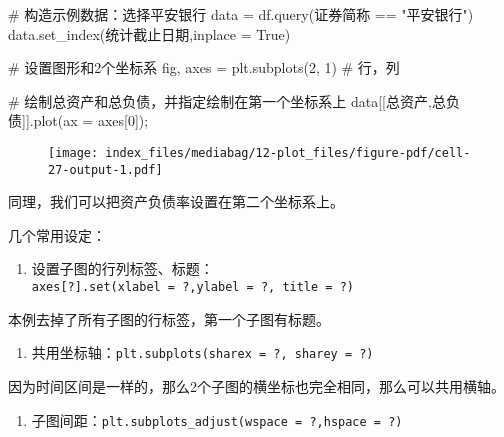 \documentclass[
  letterpaper,
  DIV=11,
  numbers=noendperiod]{scrreprt}
\newenvironment{Shaded}{\begin{snugshade}}{\end{snugshade}}
\newcommand{\CommentTok}[1]{\textcolor[rgb]{0.37,0.37,0.37}{#1}}
\newcommand{\DecValTok}[1]{\textcolor[rgb]{0.68,0.00,0.00}{#1}}
\newcommand{\NormalTok}[1]{\textcolor[rgb]{0.00,0.23,0.31}{#1}}
\newcommand{\OperatorTok}[1]{\textcolor[rgb]{0.37,0.37,0.37}{#1}}
\newcommand{\StringTok}[1]{\textcolor[rgb]{0.13,0.47,0.30}{#1}}
\newcommand{\VariableTok}[1]{\textcolor[rgb]{0.07,0.07,0.07}{#1}}
\providecommand{\tightlist}{%
  \setlength{\itemsep}{0pt}\setlength{\parskip}{0pt}}\usepackage{longtable,booktabs,array}
\begin{document}
\begin{Shaded}
\begin{Highlighting}[]
\CommentTok{\# 构造示例数据：选择平安银行}
\NormalTok{data }\OperatorTok{=}\NormalTok{ df.query(}\StringTok{\textquotesingle{}证券简称 == "平安银行"\textquotesingle{}}\NormalTok{)}
\NormalTok{data.set\_index(}\StringTok{\textquotesingle{}统计截止日期\textquotesingle{}}\NormalTok{,inplace }\OperatorTok{=} \VariableTok{True}\NormalTok{)}

\CommentTok{\# 设置图形和2个坐标系}
\NormalTok{fig, axes }\OperatorTok{=}\NormalTok{ plt.subplots(}\DecValTok{2}\NormalTok{, }\DecValTok{1}\NormalTok{) }\CommentTok{\# 行，列}

\CommentTok{\# 绘制总资产和总负债，并指定绘制在第一个坐标系上}
\NormalTok{data[[}\StringTok{\textquotesingle{}总资产\textquotesingle{}}\NormalTok{,}\StringTok{\textquotesingle{}总负债\textquotesingle{}}\NormalTok{]].plot(ax }\OperatorTok{=}\NormalTok{ axes[}\DecValTok{0}\NormalTok{])}\OperatorTok{;}
\end{Highlighting}
\end{Shaded}

\begin{figure}[H]

{\centering \texttt{[image: index\_files/mediabag/12-plot\_files/figure-pdf/cell-27-output-1.pdf]}

}

\end{figure}

同理，我们可以把资产负债率设置在第二个坐标系上。

几个常用设定：

\begin{enumerate}
\def\labelenumi{\arabic{enumi}.}
\tightlist
\item
  设置子图的行列标签、标题：
  \texttt{axes{[}?{]}.set(xlabel\ =\ ?,ylabel\ =\ ?,\ title\ =\ ?)}
\end{enumerate}

本例去掉了所有子图的行标签，第一个子图有标题。

\begin{enumerate}
\def\labelenumi{\arabic{enumi}.}
\setcounter{enumi}{1}
\tightlist
\item
  共用坐标轴：\texttt{plt.subplots(sharex\ =\ ?,\ sharey\ =\ ?)}
\end{enumerate}

因为时间区间是一样的，那么2个子图的横坐标也完全相同，那么可以共用横轴。

\begin{enumerate}
\def\labelenumi{\arabic{enumi}.}
\setcounter{enumi}{2}
\tightlist
\item
  子图间距：\texttt{plt.subplots\_adjust(wspace\ =\ ?,hspace\ =\ ?)}
\end{enumerate}
\end{document}
